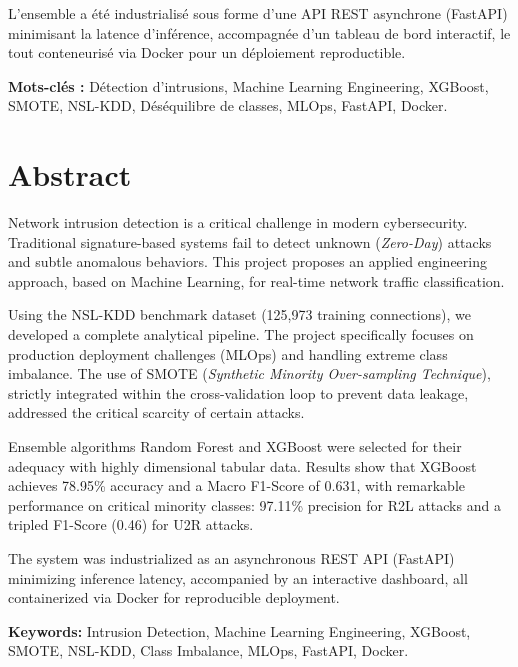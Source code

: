 \documentclass[12pt,a4paper]{report}
\begin{document}
L'ensemble a été industrialisé sous forme d'une API REST asynchrone (FastAPI) minimisant la latence d'inférence, accompagnée d'un tableau de bord interactif, le tout conteneurisé via Docker pour un déploiement reproductible.

\textbf{Mots-clés :} Détection d'intrusions, Machine Learning Engineering, XGBoost, SMOTE, NSL-KDD, Déséquilibre de classes, MLOps, FastAPI, Docker.

\vspace{1cm}

\chapter*{Abstract}

Network intrusion detection is a critical challenge in modern cybersecurity. Traditional signature-based systems fail to detect unknown (\textit{Zero-Day}) attacks and subtle anomalous behaviors. This project proposes an applied engineering approach, based on Machine Learning, for real-time network traffic classification.

Using the NSL-KDD benchmark dataset (125,973 training connections), we developed a complete analytical pipeline. The project specifically focuses on production deployment challenges (MLOps) and handling extreme class imbalance. The use of SMOTE (\textit{Synthetic Minority Over-sampling Technique}), strictly integrated within the cross-validation loop to prevent data leakage, addressed the critical scarcity of certain attacks.

Ensemble algorithms Random Forest and XGBoost were selected for their adequacy with highly dimensional tabular data. Results show that XGBoost achieves 78.95\% accuracy and a Macro F1-Score of 0.631, with remarkable performance on critical minority classes: 97.11\% precision for R2L attacks and a tripled F1-Score (0.46) for U2R attacks.

The system was industrialized as an asynchronous REST API (FastAPI) minimizing inference latency, accompanied by an interactive dashboard, all containerized via Docker for reproducible deployment.

\textbf{Keywords:} Intrusion Detection, Machine Learning Engineering, XGBoost, SMOTE, NSL-KDD, Class Imbalance, MLOps, FastAPI, Docker.

\tableofcontents
\listoffigures
\listoftables
\end{document}
